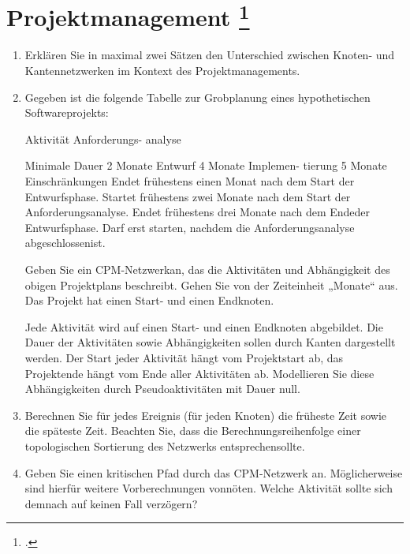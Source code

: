 \documentclass{lehramt-informatik-aufgabe}
\begin{document}

\section{Projektmanagement
\footcite[Thema 2 Teilaufgabe 2 Aufgabe 4]{examen:66116:2016:03}}

\begin{enumerate}


\item Erklären Sie in maximal zwei Sätzen den Unterschied zwischen
Knoten- und Kantennetzwerken im Kontext des Projektmanagements.


\item Gegeben ist die folgende Tabelle zur Grobplanung eines
hypothetischen Softwareprojekts:

Aktivität
Anforderungs-
analyse

Minimale Dauer
2 Monate
Entwurf 4 Monate
Implemen-
tierung 5 Monate
Einschränkungen
Endet frühestens einen Monat nach dem Start der
Entwurfsphase.
Startet frühestens zwei Monate nach dem Start der
Anforderungsanalyse.
Endet frühestens drei Monate nach dem Endeder
Entwurfsphase. Darf erst starten, nachdem die
Anforderungsanalyse abgeschlossenist.

Geben Sie ein CPM-Netzwerkan, das die Aktivitäten und Abhängigkeit des
obigen Projektplans beschreibt. Gehen Sie von der Zeiteinheit „Monate“
aus. Das Projekt hat einen Start- und einen Endknoten.

Jede Aktivität wird auf einen Start- und einen Endknoten abgebildet. Die
Dauer der Aktivitäten sowie Abhängigkeiten sollen durch Kanten
dargestellt werden. Der Start jeder Aktivität hängt vom Projektstart ab,
das Projektende hängt vom Ende aller Aktivitäten ab. Modellieren Sie
diese Abhängigkeiten durch Pseudoaktivitäten mit Dauer null.


\item Berechnen Sie für jedes Ereignis (\dh für jeden Knoten) die
früheste Zeit sowie die späteste Zeit. Beachten Sie, dass die
Berechnungsreihenfolge einer topologischen Sortierung des Netzwerks
entsprechensollte.


\item Geben Sie einen kritischen Pfad durch das CPM-Netzwerk an.
Möglicherweise sind hierfür weitere Vorberechnungen vonnöten. Welche
Aktivität sollte sich demnach auf keinen Fall verzögern?


\end{enumerate}
\end{document}
